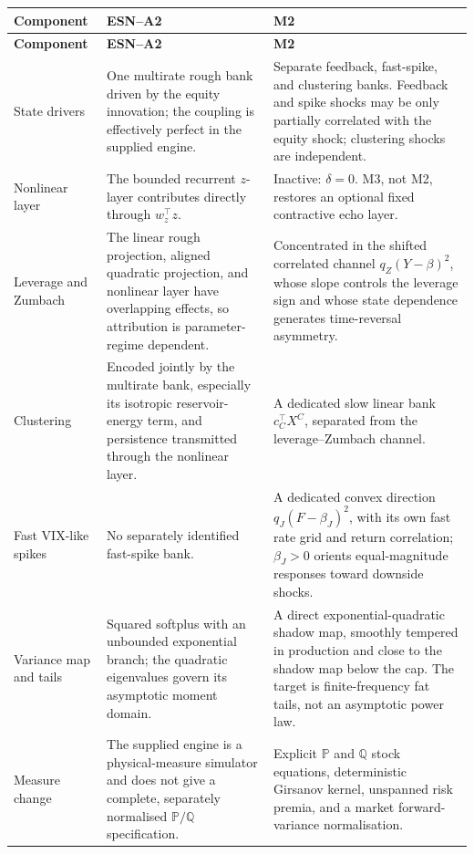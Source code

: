 \documentclass[11pt,a4paper]{article}
\newcommand{\Pp}{\mathbb{P}}
\newcommand{\Qq}{\mathbb{Q}}
\begin{document}
\small
\begin{longtable}{@{}L{25mm}L{56mm}L{56mm}@{}}
\toprule
\textbf{Component} & \textbf{ESN--A2} & \textbf{M2} \\
\midrule
\endfirsthead
\toprule
\textbf{Component} & \textbf{ESN--A2} & \textbf{M2} \\
\midrule
\endhead
State drivers
& One multirate rough bank driven by the equity innovation; the coupling is effectively
perfect in the supplied engine.
& Separate feedback, fast-spike, and clustering banks. Feedback and spike shocks may be only
partially correlated with the equity shock; clustering shocks are independent. \\
\addlinespace
Nonlinear layer
& The bounded recurrent \(z\)-layer contributes directly through \(w_z^\top z\).
& Inactive: \(\delta=0\). M3, not M2, restores an optional fixed contractive echo layer. \\
\addlinespace
Leverage and Zumbach
& The linear rough projection, aligned quadratic projection, and nonlinear layer have
overlapping effects, so attribution is parameter-regime dependent.
& Concentrated in the shifted correlated channel \(q_Z(Y-\beta)^2\), whose slope controls the
leverage sign and whose state dependence generates time-reversal asymmetry. \\
\addlinespace
Clustering
& Encoded jointly by the multirate bank, especially its isotropic reservoir-energy term, and
persistence transmitted through the nonlinear layer.
& A dedicated slow linear bank \(c_C^\top X^C\), separated from the leverage--Zumbach channel. \\
\addlinespace
Fast VIX-like spikes
& No separately identified fast-spike bank.
& A dedicated convex direction \(q_J(F-\beta_J)^2\), with its own fast rate grid and return
correlation; \(\beta_J>0\) orients equal-magnitude responses toward downside shocks. \\
\addlinespace
Variance map and tails
& Squared softplus with an unbounded exponential branch; the quadratic eigenvalues govern its
asymptotic moment domain.
& A direct exponential-quadratic shadow map, smoothly tempered in production and close to the
shadow map below the cap. The target is finite-frequency fat tails, not an asymptotic power law. \\
\addlinespace
Measure change
& The supplied engine is a physical-measure simulator and does not give a complete, separately
normalised \(\Pp/\Qq\) specification.
& Explicit \(\Pp\) and \(\Qq\) stock equations, deterministic Girsanov kernel, unspanned risk
premia, and a market forward-variance normalisation. \\

\end{longtable}
\end{document}
